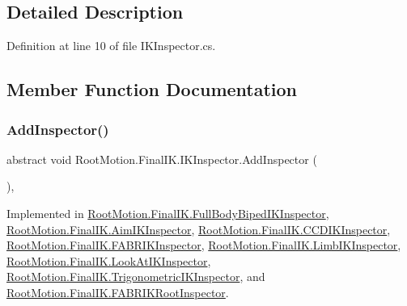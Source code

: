 \subsection{Detailed Description}


Definition at line 10 of file I\+K\+Inspector.\+cs.



\subsection{Member Function Documentation}
\mbox{\label{class_root_motion_1_1_final_i_k_1_1_i_k_inspector_a6a32ab00e4234074b64acfebb4945153}} 
\subsubsection{\texorpdfstring{Add\+Inspector()}{AddInspector()}}
{\footnotesize\ttfamily abstract void Root\+Motion.\+Final\+I\+K.\+I\+K\+Inspector.\+Add\+Inspector (\begin{DoxyParamCaption}{ }\end{DoxyParamCaption})\hspace{0.3cm}{\ttfamily [protected]}, {}}



Implemented in \mbox{\hyperlink{class_root_motion_1_1_final_i_k_1_1_full_body_biped_i_k_inspector_aa14e7b3a4ce0385ef84caa026651c6f8}{Root\+Motion.\+Final\+I\+K.\+Full\+Body\+Biped\+I\+K\+Inspector}}, \mbox{\hyperlink{class_root_motion_1_1_final_i_k_1_1_aim_i_k_inspector_a38161555789256bb549928855fd891c1}{Root\+Motion.\+Final\+I\+K.\+Aim\+I\+K\+Inspector}}, \mbox{\hyperlink{class_root_motion_1_1_final_i_k_1_1_c_c_d_i_k_inspector_ac6f83997f8ad1931a3e824852464f10e}{Root\+Motion.\+Final\+I\+K.\+C\+C\+D\+I\+K\+Inspector}}, \mbox{\hyperlink{class_root_motion_1_1_final_i_k_1_1_f_a_b_r_i_k_inspector_a5c0631e80477937b171baee777b628b9}{Root\+Motion.\+Final\+I\+K.\+F\+A\+B\+R\+I\+K\+Inspector}}, \mbox{\hyperlink{class_root_motion_1_1_final_i_k_1_1_limb_i_k_inspector_ae12aea2335d772442ac52560d85a702b}{Root\+Motion.\+Final\+I\+K.\+Limb\+I\+K\+Inspector}}, \mbox{\hyperlink{class_root_motion_1_1_final_i_k_1_1_look_at_i_k_inspector_a8f3c86ba133bbbbda630b49ccec1fb7b}{Root\+Motion.\+Final\+I\+K.\+Look\+At\+I\+K\+Inspector}}, \mbox{\hyperlink{class_root_motion_1_1_final_i_k_1_1_trigonometric_i_k_inspector_a05d2542ef28ba5180b029c82502ed877}{Root\+Motion.\+Final\+I\+K.\+Trigonometric\+I\+K\+Inspector}}, and \mbox{\hyperlink{class_root_motion_1_1_final_i_k_1_1_f_a_b_r_i_k_root_inspector_ac2cb8badb18c83369ddf9bffef415a68}{Root\+Motion.\+Final\+I\+K.\+F\+A\+B\+R\+I\+K\+Root\+Inspector}}.

